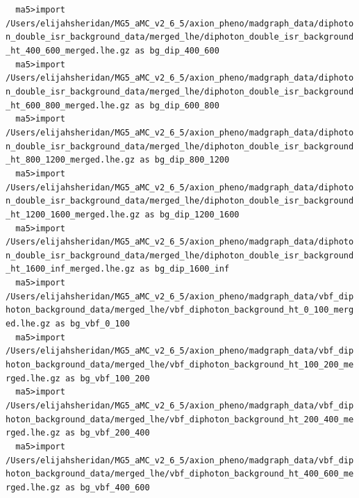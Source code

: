\documentclass[a4paper, 10pt]{article}
\begin{document}
\texttt{ }\texttt{ }\texttt{ma5>import /\-Users/\-elijahsheridan/\-MG5\_aMC\_v2\_6\_5/\-axion\_pheno/\-madgraph\_data/\-diphoton\_double\_isr\_background\_data/\-merged\_lhe/\-diphoton\_double\_isr\_background\_ht\_400\_600\_merged.lhe.gz as bg\_dip\_400\_600\\
}
\texttt{ }\texttt{ }\texttt{ma5>import /\-Users/\-elijahsheridan/\-MG5\_aMC\_v2\_6\_5/\-axion\_pheno/\-madgraph\_data/\-diphoton\_double\_isr\_background\_data/\-merged\_lhe/\-diphoton\_double\_isr\_background\_ht\_600\_800\_merged.lhe.gz as bg\_dip\_600\_800\\
}
\texttt{ }\texttt{ }\texttt{ma5>import /\-Users/\-elijahsheridan/\-MG5\_aMC\_v2\_6\_5/\-axion\_pheno/\-madgraph\_data/\-diphoton\_double\_isr\_background\_data/\-merged\_lhe/\-diphoton\_double\_isr\_background\_ht\_800\_1200\_merged.lhe.gz as bg\_dip\_800\_1200\\
}
\texttt{ }\texttt{ }\texttt{ma5>import /\-Users/\-elijahsheridan/\-MG5\_aMC\_v2\_6\_5/\-axion\_pheno/\-madgraph\_data/\-diphoton\_double\_isr\_background\_data/\-merged\_lhe/\-diphoton\_double\_isr\_background\_ht\_1200\_1600\_merged.lhe.gz as bg\_dip\_1200\_1600\\
}
\texttt{ }\texttt{ }\texttt{ma5>import /\-Users/\-elijahsheridan/\-MG5\_aMC\_v2\_6\_5/\-axion\_pheno/\-madgraph\_data/\-diphoton\_double\_isr\_background\_data/\-merged\_lhe/\-diphoton\_double\_isr\_background\_ht\_1600\_inf\_merged.lhe.gz as bg\_dip\_1600\_inf\\
}
\texttt{ }\texttt{ }\texttt{ma5>import /\-Users/\-elijahsheridan/\-MG5\_aMC\_v2\_6\_5/\-axion\_pheno/\-madgraph\_data/\-vbf\_diphoton\_background\_data/\-merged\_lhe/\-vbf\_diphoton\_background\_ht\_0\_100\_merged.lhe.gz as bg\_vbf\_0\_100\\
}
\texttt{ }\texttt{ }\texttt{ma5>import /\-Users/\-elijahsheridan/\-MG5\_aMC\_v2\_6\_5/\-axion\_pheno/\-madgraph\_data/\-vbf\_diphoton\_background\_data/\-merged\_lhe/\-vbf\_diphoton\_background\_ht\_100\_200\_merged.lhe.gz as bg\_vbf\_100\_200\\
}
\texttt{ }\texttt{ }\texttt{ma5>import /\-Users/\-elijahsheridan/\-MG5\_aMC\_v2\_6\_5/\-axion\_pheno/\-madgraph\_data/\-vbf\_diphoton\_background\_data/\-merged\_lhe/\-vbf\_diphoton\_background\_ht\_200\_400\_merged.lhe.gz as bg\_vbf\_200\_400\\
}
\texttt{ }\texttt{ }\texttt{ma5>import /\-Users/\-elijahsheridan/\-MG5\_aMC\_v2\_6\_5/\-axion\_pheno/\-madgraph\_data/\-vbf\_diphoton\_background\_data/\-merged\_lhe/\-vbf\_diphoton\_background\_ht\_400\_600\_merged.lhe.gz as bg\_vbf\_400\_600\\
}
\end{document}
